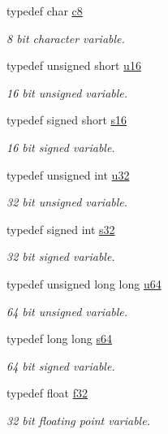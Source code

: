 \begin{DoxyCompactItemize}
typedef char \hyperlink{namespaceirr_a9395eaea339bcb546b319e9c96bf7410}{c8}
\begin{DoxyCompactList}\small\item\em 8 bit character variable. \end{DoxyCompactList}\item 
typedef unsigned short \hyperlink{namespaceirr_ae9f8ec82692ad3b83c21f555bfa70bcc}{u16}
\begin{DoxyCompactList}\small\item\em 16 bit unsigned variable. \end{DoxyCompactList}\item 
typedef signed short \hyperlink{namespaceirr_a43ace0af066371ac0862bac3f7314220}{s16}
\begin{DoxyCompactList}\small\item\em 16 bit signed variable. \end{DoxyCompactList}\item 
typedef unsigned int \hyperlink{namespaceirr_a0416a53257075833e7002efd0a18e804}{u32}
\begin{DoxyCompactList}\small\item\em 32 bit unsigned variable. \end{DoxyCompactList}\item 
typedef signed int \hyperlink{namespaceirr_ac66849b7a6ed16e30ebede579f9b47c6}{s32}
\begin{DoxyCompactList}\small\item\em 32 bit signed variable. \end{DoxyCompactList}\item 
typedef unsigned long long \hyperlink{namespaceirr_a9701cac11d289143453e212684075af7}{u64}
\begin{DoxyCompactList}\small\item\em 64 bit unsigned variable. \end{DoxyCompactList}\item 
typedef long long \hyperlink{namespaceirr_abf54bd535f8d4dd996270e68c3ad8c08}{s64}
\begin{DoxyCompactList}\small\item\em 64 bit signed variable. \end{DoxyCompactList}\item 
typedef float \hyperlink{namespaceirr_a0277be98d67dc26ff93b1a6a1d086b07}{f32}
\begin{DoxyCompactList}\small\item\em 32 bit floating point variable. \end{DoxyCompactList}\item 

\end{DoxyCompactItemize}
